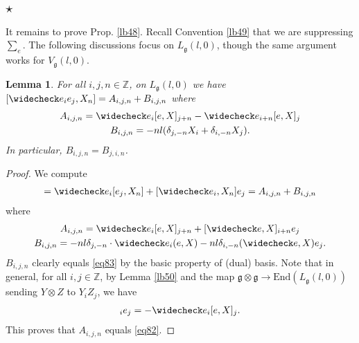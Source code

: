 \documentclass[11pt,b5paper,notitlepage]{article}
\theoremstyle{definition}
\theoremstyle{plain}
\newtheorem{lm}[df]{Lemma}
\newcommand{\wch}{\widecheck}
\newcommand{\End}{\mathrm{End}} %
\newcommand{\gk}{\mathfrak g}
\newcommand{\Zbb}{\mathbb Z}
\numberwithin{equation}{section}
\begin{document}
\subsection{$\star$}


It remains to prove Prop. \ref{lb48}. Recall Convention \ref{lb49} that we are suppressing $\sum_e$. The following discussions focus on $L_\gk(l,0)$, though the same argument works for $V_\gk(l,0)$.

\begin{lm}\label{lb51}
For all $i,j,n\in\Zbb$, on $L_\gk(l,0)$ we have $[\wch e_ie_j,X_n]=A_{i,j,n}+B_{i,j,n}$ where
\begin{subequations}
\begin{gather}
A_{i,j,n}=\wch e_i[e,X]_{j+n}-\wch e_{i+n}[e,X]_j\label{eq82}\\
B_{i,j,n}=-nl(\delta_{j,-n}X_i+\delta_{i,-n}X_j).	\label{eq83}
\end{gather}
\end{subequations}
In particular, $B_{i,j,n}=B_{j,i,n}$.
\end{lm}

\begin{proof}
We compute
\begin{align*}
[\wch e_ie_j,X_n]=\wch e_i[e_j,X_n]+[\wch e_i,X_n]e_j=A_{i,j,n}+B_{i,j,n}	
\end{align*}	
where
\begin{gather*}
A_{i,j,n}=\wch e_i[e,X]_{j+n}+[\wch e,X]_{i+n}e_j\\
B_{i,j,n}=-nl \delta_{j,-n}\cdot \wch e_i(e,X)-nl\delta_{i,-n}(\wch e,X)e_j.	
\end{gather*}
$B_{i,j,n}$ clearly equals \eqref{eq83} by the basic property of (dual) basis. Note that in general, for all $i,j\in\Zbb$, by Lemma \ref{lb50} and the map $\gk\otimes\gk\rightarrow\End(L_\gk(l,0))$ sending $Y\otimes Z$ to $Y_iZ_j$, we have
\begin{align}
[\wch e,X]_ie_j=-\wch e_i[e,X]_j.\label{eq86}
\end{align}
This proves that $A_{i,j,n}$ equals \eqref{eq82}.
\end{proof}	
\end{document}
